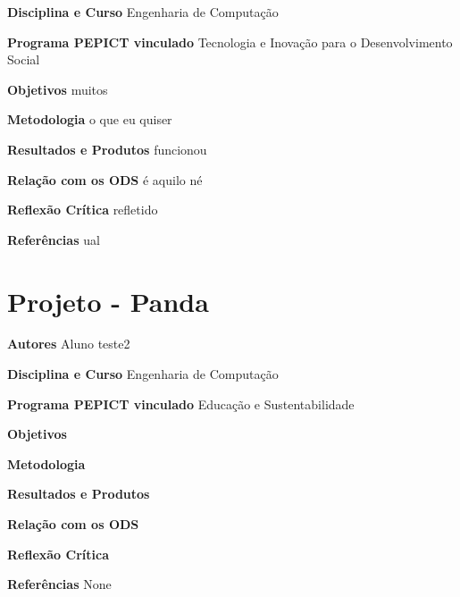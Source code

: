 \documentclass[12pt,openright,oneside,a4paper]{report}
\begin{document}
\vspace{0.7cm}
\noindent
\textbf{Disciplina e Curso}
Engenharia de Computação

\vspace{0.7cm}
\noindent
\textbf{Programa PEPICT vinculado}
Tecnologia e Inovação para o Desenvolvimento Social

\vspace{0.7cm}
\noindent
\textbf{Objetivos}
muitos

\vspace{0.7cm}
\noindent
\textbf{Metodologia}
o que eu quiser

\vspace{0.7cm}
\noindent
\textbf{Resultados e Produtos}
funcionou

\vspace{0.7cm}
\noindent
\textbf{Relação com os ODS}
é aquilo né

\vspace{0.7cm}
\noindent
\textbf{Reflexão Crítica}
refletido

\vspace{0.7cm}
\noindent
\textbf{Referências}
ual

\vspace{0.7cm}
\newpage
\section{Projeto - Panda}
\noindent
\textbf{Autores}
Aluno teste2

\vspace{0.7cm}
\noindent
\textbf{Disciplina e Curso}
Engenharia de Computação

\vspace{0.7cm}
\noindent
\textbf{Programa PEPICT vinculado}
Educação e Sustentabilidade

\vspace{0.7cm}
\noindent
\textbf{Objetivos}


\vspace{0.7cm}
\noindent
\textbf{Metodologia}


\vspace{0.7cm}
\noindent
\textbf{Resultados e Produtos}


\vspace{0.7cm}
\noindent
\textbf{Relação com os ODS}


\vspace{0.7cm}
\noindent
\textbf{Reflexão Crítica}


\vspace{0.7cm}
\noindent
\textbf{Referências}
None
\end{document}
